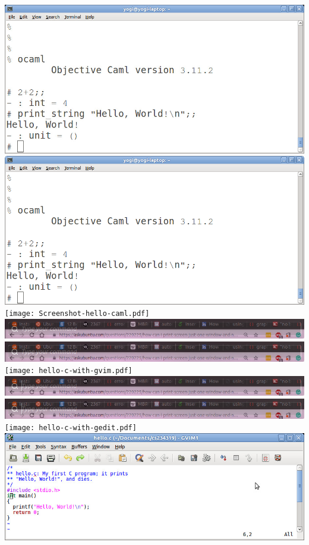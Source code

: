 \documentclass{article}
\begin{document}
\includegraphics{Screenshot-hello-caml.jpg}
\includegraphics{Screenshot-hello-caml.png}
\texttt{[image: Screenshot-hello-caml.pdf]}
\includegraphics{hello-c-with-gvim.png}
\includegraphics{hello-c-with-gvim.jpg}
\texttt{[image: hello-c-with-gvim.pdf]}
\includegraphics{hello-c-with-gedit.png}
\includegraphics{hello-c-with-gedit.jpg}
\texttt{[image: hello-c-with-gedit.pdf]}
\includegraphics{Screenshot-hello-c-GVIM.jpg}
\end{document}
